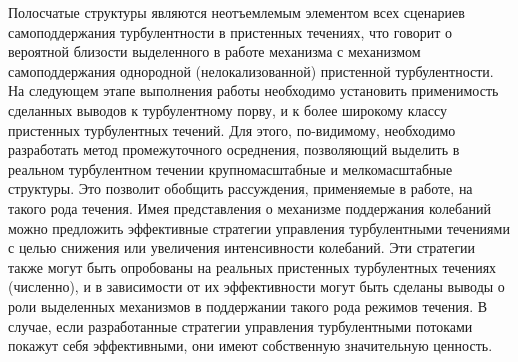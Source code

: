Полосчатые структуры являются неотъемлемым элементом всех сценариев самоподдержания турбулентности в пристенных течениях, что говорит о вероятной близости выделенного в работе механизма с механизмом самоподдержания однородной (нелокализованной) пристенной турбулентности. На следующем этапе выполнения работы необходимо установить применимость сделанных выводов к турбулентному порву, и к более широкому классу пристенных турбулентных течений. Для этого, по-видимому, необходимо разработать метод промежуточного осреднения, позволяющий выделить в реальном турбулентном течении крупномасштабные и мелкомасштабные структуры. Это позволит обобщить рассуждения, применяемые в работе, на такого рода течения. Имея представления о механизме поддержания колебаний можно предложить эффективные стратегии управления турбулентными течениями с целью снижения или увеличения интенсивности колебаний. Эти стратегии также могут быть опробованы на реальных пристенных турбулентных течениях (численно), и в зависимости от их эффективности могут быть сделаны выводы о роли выделенных механизмов в поддержании такого рода режимов течения. В случае, если разработанные стратегии управления турбулентными потоками покажут себя эффективными, они имеют собственную значительную ценность. 






